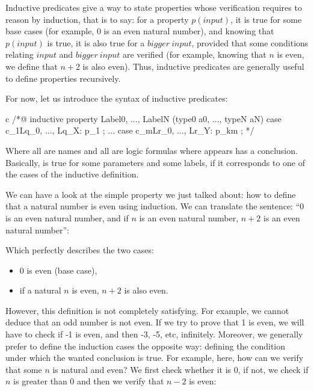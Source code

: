 Inductive predicates give a way to state properties whose verification requires
to reason by induction, that is to say: for a property $p(input)$, it is true
for some base cases (for example, $0$ is an even natural number), and knowing
that $p(input)$ is true, it is also true for a $bigger\ input$, provided that
some conditions relating $input$ and $bigger\ input$ are verified (for example,
knowing that $n$ is even, we define that $n+2$ is also even). Thus, inductive
predicates are generally useful to define properties recursively.


For now, let us introduce the syntax of inductive predicates:

\begin{CodeBlock}{c}
/*@
  inductive property{ Label0, ..., LabelN }(type0 a0, ..., typeN aN) {
  case c_1{Lq_0, ..., Lq_X}: p_1 ;
  ...
  case c_m{Lr_0, ..., Lr_Y}: p_km ;
  }
*/
\end{CodeBlock}

Where all  are names and all  are logic
formulas where  appears has a conclusion. Basically,
 is true for some parameters and some labels, if it
corresponds to one of the cases of the inductive definition.

We can have a look at the simple property we just talked about: how to define
that a natural number is even using induction. We can translate the sentence:
``0 is an even natural number, and if $n$ is an even natural number, $n+2$ is
an even natural number'':






Which perfectly describes the two cases:
\begin{itemize}
\item $0$ is even (base case),
\item if a natural $n$ is even, $n+2$ is also even.
\end{itemize}

However, this definition is not completely satisfying. For example, we cannot
deduce that an odd number is not even. If we try to prove that 1 is even, we
will have to check if -1 is even, and then -3, -5, etc, infinitely. Moreover,
we generally prefer to define the induction cases the opposite way: defining
the condition under which the wanted conclusion is true. For example, here,
how can we verify that some $n$ is natural and even? We first check whether it
is 0, if not, we check if $n$ is greater than $0$ and then we verify that $n-2$
is even:



